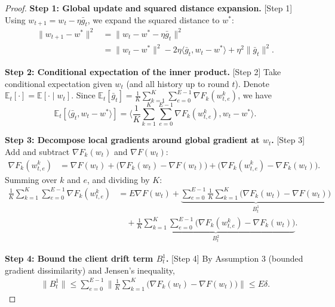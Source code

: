 \documentclass{article}
\begin{document}
\begin{proof}
\noindent \textbf{Step 1: Global update and squared distance expansion.} [Step 1]
Using $w_{t+1} = w_t - \eta \bar{g}_t$, we expand the squared distance to $w^*$:
\begin{align}
\|w_{t+1} - w^*\|^2 &= \|w_t - w^* - \eta \bar{g}_t\|^2 \\
&= \|w_t - w^*\|^2 - 2\eta \langle \bar{g}_t, w_t - w^* \rangle + \eta^2 \|\bar{g}_t\|^2. \tag{1}
\end{align}

\noindent \textbf{Step 2: Conditional expectation of the inner product.} [Step 2]
Take conditional expectation given $w_t$ (and all history up to round $t$). Denote $\mathbb{E}_t[\cdot] = \mathbb{E}[\cdot \mid w_t]$. Since $\mathbb{E}_t[\bar{g}_t] = \frac{1}{K}\sum_{k=1}^K \sum_{e=0}^{E-1} \nabla F_k(w_{t,e}^k)$, we have
\begin{equation}
\mathbb{E}_t[\langle \bar{g}_t, w_t - w^* \rangle] = \Big\langle \frac{1}{K}\sum_{k=1}^K \sum_{e=0}^{E-1} \nabla F_k(w_{t,e}^k), w_t - w^* \Big\rangle. \tag{2}
\end{equation}

\noindent \textbf{Step 3: Decompose local gradients around global gradient at $w_t$.} [Step 3]
Add and subtract $\nabla F_k(w_t)$ and $\nabla F(w_t)$:
\begin{align}
\nabla F_k(w_{t,e}^k) &= \nabla F(w_t) + \big(\nabla F_k(w_t) - \nabla F(w_t)\big) + \big(\nabla F_k(w_{t,e}^k) - \nabla F_k(w_t)\big). \tag{3}
\end{align}
Summing over $k$ and $e$, and dividing by $K$:
\begin{align}
\frac{1}{K}\sum_{k=1}^K \sum_{e=0}^{E-1} \nabla F_k(w_{t,e}^k) &= E \nabla F(w_t) + \underbrace{\sum_{e=0}^{E-1} \frac{1}{K}\sum_{k=1}^K \big(\nabla F_k(w_t) - \nabla F(w_t)\big)}_{B_t^1} \\
&\quad + \underbrace{\frac{1}{K}\sum_{k=1}^K \sum_{e=0}^{E-1} \big(\nabla F_k(w_{t,e}^k) - \nabla F_k(w_t)\big)}_{B_t^2}. \tag{4}
\end{align}

\noindent \textbf{Step 4: Bound the client drift term $B_t^1$.} [Step 4]
By Assumption 3 (bounded gradient dissimilarity) and Jensen's inequality,
\begin{align}
\|B_t^1\| \le \sum_{e=0}^{E-1} \Big\|\frac{1}{K}\sum_{k=1}^K \big(\nabla F_k(w_t) - \nabla F(w_t)\big)\Big\| \le E \delta. \tag{5}
\end{align}


\end{proof}
\end{document}
